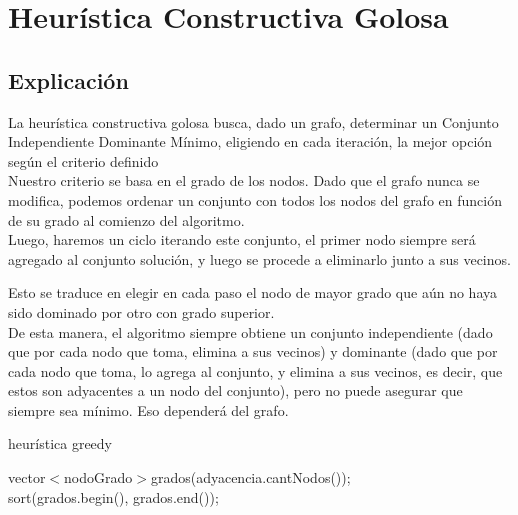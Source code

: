 \section{Heur\'istica Constructiva Golosa} \label{ej3}
\subsection{Explicaci\'on}
La heurística constructiva golosa busca, dado un grafo, determinar un Conjunto Independiente Dominante Mínimo, eligiendo en cada iteraci\'on, la mejor opci\'on seg\'un el criterio definido\\

Nuestro criterio se basa en el grado de los nodos. Dado que el grafo nunca se modifica, podemos ordenar un conjunto con todos los nodos del grafo en funci\'on de su grado al comienzo del algoritmo.\\

Luego, haremos un ciclo iterando este conjunto, el primer nodo siempre ser\'a agregado al conjunto soluci\'on, y luego se procede a eliminarlo junto a sus vecinos.

Esto se traduce en elegir en cada paso el nodo de mayor grado que a\'un no haya sido dominado por otro con grado superior.\\

De esta manera, el algoritmo siempre obtiene un conjunto independiente (dado que por cada nodo que toma, elimina a sus vecinos) y dominante (dado que por cada nodo que toma, lo agrega al conjunto, y elimina a sus vecinos, es decir, que estos son adyacentes a un nodo del conjunto), pero no puede asegurar que siempre sea mínimo. Eso dependerá del grafo.\\

\begin{algorithm}[h!]
\caption{heur\'istica greedy}
vector$<$nodoGrado$>$grados(adyacencia.cantNodos());\\
sort(grados.begin(), grados.end());\\
\end{algorithm}


